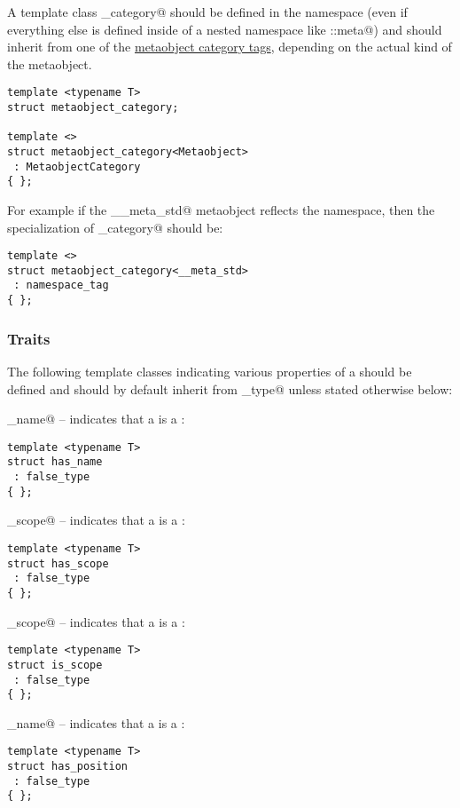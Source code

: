 A template class \verb@metaobject_category@ should be defined in the \verb@std@ namespace
(even if everything else is defined inside of a nested namespace like \verb@std::meta@)
and should inherit from
one of the \hyperref[metaobject-category-tags]{metaobject category tags}, depending on
the actual kind of the metaobject.

\begin{verbatim}
template <typename T>
struct metaobject_category;

template <>
struct metaobject_category<Metaobject>
 : MetaobjectCategory
{ };
\end{verbatim}

For example if the \verb@__meta_std@ metaobject reflects the \verb@std@ namespace,
then the specialization of \verb@metaobject_category@ should be:

\begin{verbatim}
template <>
struct metaobject_category<__meta_std>
 : namespace_tag
{ };
\end{verbatim}

\subsubsection{Traits}

The following template classes indicating various properties of a 
should be defined and should by default inherit from \verb@false_type@ unless stated
otherwise below:

\verb@has_name@ -- indicates that a  is a :
\begin{verbatim}
template <typename T>
struct has_name
 : false_type
{ };
\end{verbatim}

\verb@has_scope@ -- indicates that a  is a :
\begin{verbatim}
template <typename T>
struct has_scope
 : false_type
{ };
\end{verbatim}

\verb@is_scope@ -- indicates that a  is a :
\begin{verbatim}
template <typename T>
struct is_scope
 : false_type
{ };
\end{verbatim}

\verb@has_name@ -- indicates that a  is a :
\begin{verbatim}
template <typename T>
struct has_position
 : false_type
{ };
\end{verbatim}

